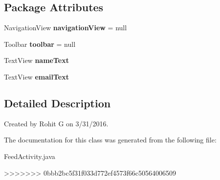 \subsection*{\-Package \-Attributes}
\begin{DoxyCompactItemize}
\item 
\hypertarget{classcom_1_1example_1_1sel_1_1lostfound_1_1FeedActivity_a51b8f541b1fa87bae79552e02354112c}{\-Navigation\-View {\bfseries navigation\-View} = null}\label{classcom_1_1example_1_1sel_1_1lostfound_1_1FeedActivity_a51b8f541b1fa87bae79552e02354112c}

\item 
\hypertarget{classcom_1_1example_1_1sel_1_1lostfound_1_1FeedActivity_a8513e4158e73b84a7fd07415fded1478}{\-Toolbar {\bfseries toolbar} = null}\label{classcom_1_1example_1_1sel_1_1lostfound_1_1FeedActivity_a8513e4158e73b84a7fd07415fded1478}

\item 
\hypertarget{classcom_1_1example_1_1sel_1_1lostfound_1_1FeedActivity_ad25f59821cace19c4a041b416d524e6b}{\-Text\-View {\bfseries name\-Text}}\label{classcom_1_1example_1_1sel_1_1lostfound_1_1FeedActivity_ad25f59821cace19c4a041b416d524e6b}

\item 
\hypertarget{classcom_1_1example_1_1sel_1_1lostfound_1_1FeedActivity_aba980cd82976141d8376704b9b3a4561}{\-Text\-View {\bfseries email\-Text}}\label{classcom_1_1example_1_1sel_1_1lostfound_1_1FeedActivity_aba980cd82976141d8376704b9b3a4561}

\end{DoxyCompactItemize}


\subsection{\-Detailed \-Description}
\-Created by \-Rohit \-G on 3/31/2016. 

\-The documentation for this class was generated from the following file\-:\begin{DoxyCompactItemize}
\item 
\-Feed\-Activity.\-java\end{DoxyCompactItemize}
>>>>>>> 0bbb2bc5f31f033d772ef4573f66c50564006509
